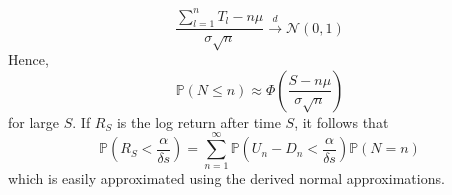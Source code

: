 \documentclass[a4paper,10pt]{article}
\begin{document}
\begin{equation}
\frac{\sum_{l=1}^n T_l - n\mu}{\sigma \sqrt{n}} \xrightarrow{d} \mathcal{N}(0, 1)
\end{equation}
Hence,
\begin{equation}
\mathbb{P}(N \leq n) \approx \Phi\left(\frac{S - n\mu}{\sigma \sqrt{n}} \right)
\end{equation}
for large $S$. If $R_S$ is the log return after time $S$, it follows that
\begin{equation}
\mathbb{P}\left(R_S < \frac{\alpha}{\delta s}\right) = \sum_{n=1}^{\infty} \mathbb{P}\left(U_n - D_n < \frac{\alpha}{\delta s}\right)\mathbb{P}(N = n)
\end{equation}
which is easily approximated using the derived normal approximations.
\medskip
\printbibliography
\end{document}
